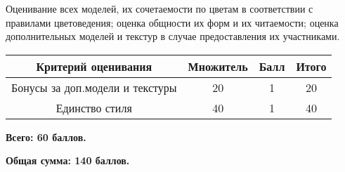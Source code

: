 Оценивание всех моделей, их сочетаемости по цветам в соответствии с правилами цветоведения; оценка общности их форм и их читаемости; оценка дополнительных моделей и текстур в случае предоставления их участниками. 

\begin{table}[H]
    \begin{center}
        \begin{tabular}{|c|c|c|c|}
            \hline
            Критерий оценивания &	Множитель &	Балл &	Итого \\
            \hline
            Бонусы за доп.модели и текстуры  & 20 & 1 & 20 \\
            \hline
            Единство стиля & 40	& 1 & 40 \\   
            \hline
        \end{tabular} 
    \end {center} 
\end{table}



\textbf{Всего: 60 баллов.}

\textbf{Общая сумма: 140 баллов.}

